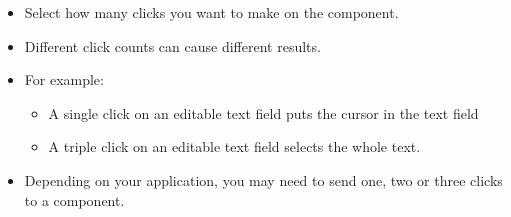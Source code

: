 \begin{itemize}
\item Select how many clicks you want to make on the component.
\item Different click counts can cause different results.
\item For example:
\begin{itemize}
\item A single click on an editable text field puts the cursor in the text field
\item A triple click on an editable text field selects the whole text.
\end{itemize}
\item Depending on your application, you may need to send one, two or three clicks to a component. 
\end{itemize}

    
